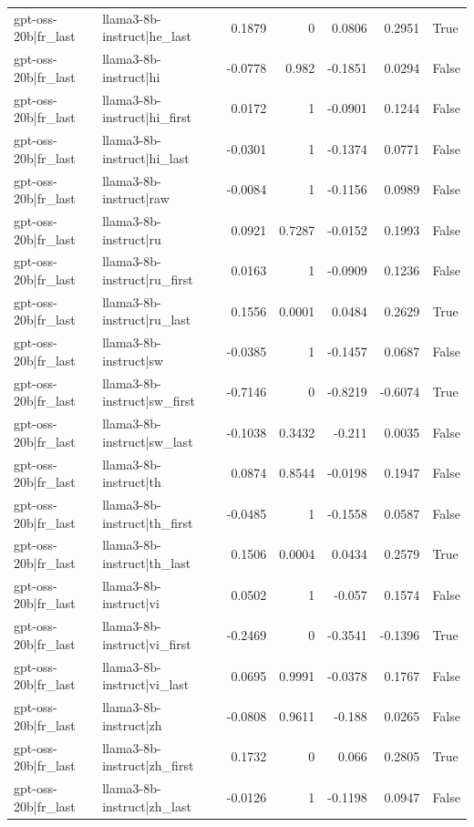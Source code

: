 \begin{table}
\begin{tabular}{l l r r r r l}
gpt-oss-20b|fr_last & llama3-8b-instruct|he_last & 0.1879 & 0 & 0.0806 & 0.2951 & True \\
gpt-oss-20b|fr_last & llama3-8b-instruct|hi & -0.0778 & 0.982 & -0.1851 & 0.0294 & False \\
gpt-oss-20b|fr_last & llama3-8b-instruct|hi_first & 0.0172 & 1 & -0.0901 & 0.1244 & False \\
gpt-oss-20b|fr_last & llama3-8b-instruct|hi_last & -0.0301 & 1 & -0.1374 & 0.0771 & False \\
gpt-oss-20b|fr_last & llama3-8b-instruct|raw & -0.0084 & 1 & -0.1156 & 0.0989 & False \\
gpt-oss-20b|fr_last & llama3-8b-instruct|ru & 0.0921 & 0.7287 & -0.0152 & 0.1993 & False \\
gpt-oss-20b|fr_last & llama3-8b-instruct|ru_first & 0.0163 & 1 & -0.0909 & 0.1236 & False \\
gpt-oss-20b|fr_last & llama3-8b-instruct|ru_last & 0.1556 & 0.0001 & 0.0484 & 0.2629 & True \\
gpt-oss-20b|fr_last & llama3-8b-instruct|sw & -0.0385 & 1 & -0.1457 & 0.0687 & False \\
gpt-oss-20b|fr_last & llama3-8b-instruct|sw_first & -0.7146 & 0 & -0.8219 & -0.6074 & True \\
gpt-oss-20b|fr_last & llama3-8b-instruct|sw_last & -0.1038 & 0.3432 & -0.211 & 0.0035 & False \\
gpt-oss-20b|fr_last & llama3-8b-instruct|th & 0.0874 & 0.8544 & -0.0198 & 0.1947 & False \\
gpt-oss-20b|fr_last & llama3-8b-instruct|th_first & -0.0485 & 1 & -0.1558 & 0.0587 & False \\
gpt-oss-20b|fr_last & llama3-8b-instruct|th_last & 0.1506 & 0.0004 & 0.0434 & 0.2579 & True \\
gpt-oss-20b|fr_last & llama3-8b-instruct|vi & 0.0502 & 1 & -0.057 & 0.1574 & False \\
gpt-oss-20b|fr_last & llama3-8b-instruct|vi_first & -0.2469 & 0 & -0.3541 & -0.1396 & True \\
gpt-oss-20b|fr_last & llama3-8b-instruct|vi_last & 0.0695 & 0.9991 & -0.0378 & 0.1767 & False \\
gpt-oss-20b|fr_last & llama3-8b-instruct|zh & -0.0808 & 0.9611 & -0.188 & 0.0265 & False \\
gpt-oss-20b|fr_last & llama3-8b-instruct|zh_first & 0.1732 & 0 & 0.066 & 0.2805 & True \\
gpt-oss-20b|fr_last & llama3-8b-instruct|zh_last & -0.0126 & 1 & -0.1198 & 0.0947 & False \\

\end{tabular}
\end{table}
